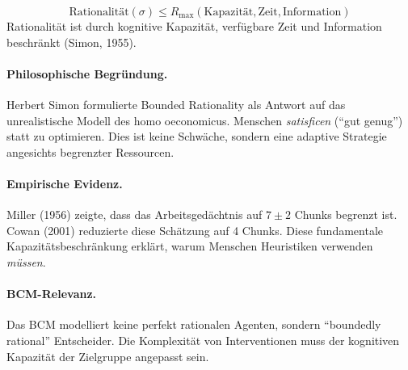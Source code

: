 \begin{axiom}
\begin{equation}
\text{Rationalität}(\sigma) \leq R_{\max}(\text{Kapazität}, \text{Zeit}, \text{Information})
\end{equation}
Rationalität ist durch kognitive Kapazität, verfügbare Zeit und Information beschränkt (Simon, 1955).

\paragraph{Philosophische Begründung.}
Herbert Simon formulierte Bounded Rationality als Antwort auf das unrealistische Modell des homo oeconomicus. Menschen \textit{satisficen} (``gut genug'') statt zu optimieren. Dies ist keine Schwäche, sondern eine adaptive Strategie angesichts begrenzter Ressourcen.

\paragraph{Empirische Evidenz.}
Miller (1956) zeigte, dass das Arbeitsgedächtnis auf $7 \pm 2$ Chunks begrenzt ist. Cowan (2001) reduzierte diese Schätzung auf 4 Chunks. Diese fundamentale Kapazitätsbeschränkung erklärt, warum Menschen Heuristiken verwenden \textit{müssen}.

\paragraph{BCM-Relevanz.}
Das BCM modelliert keine perfekt rationalen Agenten, sondern ``boundedly rational'' Entscheider. Die Komplexität von Interventionen muss der kognitiven Kapazität der Zielgruppe angepasst sein.
\end{axiom}

